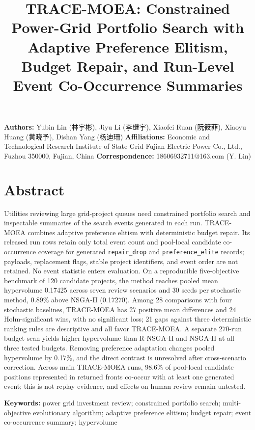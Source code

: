 \documentclass[
  10pt,
  a4paper,
]{article}
\title{TRACE-MOEA: Constrained Power-Grid Portfolio Search with Adaptive
Preference Elitism, Budget Repair, and Run-Level Event Co-Occurrence
Summaries}
\author{}
\date{}
\begin{document}
\maketitle

{
\setcounter{tocdepth}{3}
\tableofcontents
}
\textbf{Authors:} Yubin Lin (林宇彬), Jiyu Li (李继宇), Xiaofei Ruan
(阮筱菲), Xiaoyu Huang (黄晓予), Dishan Yang (杨迪珊)
\textbf{Affiliations:} Economic and Technological Research Institute of
State Grid Fujian Electric Power Co., Ltd., Fuzhou 350000, Fujian, China
\textbf{Correspondence:} 18606932711@163.com (Y. Lin)

\section{Abstract}\label{abstract}

Utilities reviewing large grid-project queues need constrained portfolio
search and inspectable summaries of the search events generated in each
run. TRACE-MOEA combines adaptive preference elitism with deterministic
budget repair. Its released run rows retain only total event count and
pool-local candidate co-occurrence coverage for generated
\texttt{repair\_drop} and \texttt{preference\_elite} records; payloads,
replacement flags, stable project identifiers, and event order are not
retained. No event statistic enters evaluation. On a reproducible
five-objective benchmark of 120 candidate projects, the method reaches
pooled mean hypervolume 0.17425 across seven review scenarios and 30
seeds per stochastic method, 0.89\% above NSGA-II (0.17270). Among 28
comparisons with four stochastic baselines, TRACE-MOEA has 27 positive
mean differences and 24 Holm-significant wins, with no significant loss;
21 gaps against three deterministic ranking rules are descriptive and
all favor TRACE-MOEA. A separate 270-run budget scan yields higher
hypervolume than R-NSGA-II and NSGA-II at all three tested budgets.
Removing preference adaptation changes pooled hypervolume by 0.17\%, and
the direct contrast is unresolved after cross-scenario correction.
Across main TRACE-MOEA runs, 98.6\% of pool-local candidate positions
represented in returned fronts co-occur with at least one generated
event; this is not replay evidence, and effects on human review remain
untested.

\textbf{Keywords:} power grid investment review; constrained portfolio
search; multi-objective evolutionary algorithm; adaptive preference
elitism; budget repair; event co-occurrence summary; hypervolume
\end{document}
